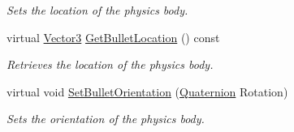 \begin{DoxyCompactItemize}
\begin{DoxyCompactList}\small\item\em Sets the location of the physics body. \item\end{DoxyCompactList}\item 
virtual \hyperlink{classphys_1_1Vector3}{Vector3} \hyperlink{classphys_1_1ActorBase_a9b32df1efdc346f5d6c0920b959c09a3}{GetBulletLocation} () const 
\begin{DoxyCompactList}\small\item\em Retrieves the location of the physics body. \item\end{DoxyCompactList}\item 
virtual void \hyperlink{classphys_1_1ActorBase_a492244ac46ced53b809f436da992bc84}{SetBulletOrientation} (\hyperlink{classphys_1_1Quaternion}{Quaternion} Rotation)
\begin{DoxyCompactList}\small\item\em Sets the orientation of the physics body. \item\end{DoxyCompactList}\end{DoxyCompactItemize}
